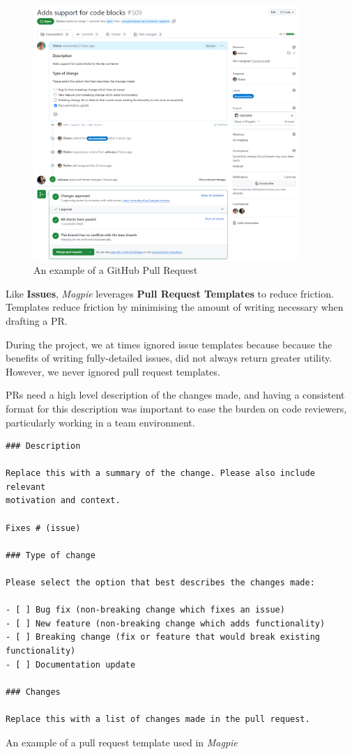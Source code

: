 \documentclass[preview]{standalone}
\begin{document}
\begin{figure}[htbp]
    \centering{}
    \includegraphics[width=0.90\textwidth]{images/github_pr.png}
    \caption{An example of a GitHub Pull Request}
\end{figure}

\newpage{}

Like \textbf{Issues}, \textit{Magpie} leverages \textbf{Pull Request Templates}
to reduce friction. Templates reduce friction by minimising the amount of
writing necessary when drafting a PR.

During the project, we at times ignored issue templates because because the
benefits of writing fully-detailed issues, did not always return greater
utility. However, we never ignored pull request templates.

PRs need a high level description of the changes made, and having a consistent
format for this description was important to ease the burden on code reviewers,
particularly working in a team environment.

\begin{listing}[htbp]
    \centering{}
    \begin{verbatim}
### Description

Replace this with a summary of the change. Please also include relevant
motivation and context.

Fixes # (issue)

### Type of change

Please select the option that best describes the changes made:

- [ ] Bug fix (non-breaking change which fixes an issue)
- [ ] New feature (non-breaking change which adds functionality)
- [ ] Breaking change (fix or feature that would break existing functionality)
- [ ] Documentation update

### Changes

Replace this with a list of changes made in the pull request.
    \end{verbatim}
    \caption{An example of a pull request template used in \textit{Magpie}}
\end{listing}
\end{document}
